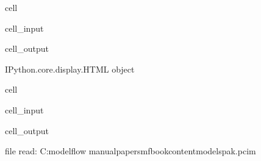 \documentclass[letterpaper,10pt,english]{jupyterBook}
\begin{document}
\begin{sphinxuseclass}{cell}\begin{sphinxVerbatimInput}

\begin{sphinxuseclass}{cell_input}
\begin{sphinxVerbatim}[commandchars=\\\{\}]
    
\end{sphinxVerbatim}

\end{sphinxuseclass}\end{sphinxVerbatimInput}
\begin{sphinxVerbatimOutput}

\begin{sphinxuseclass}{cell_output}
\begin{sphinxVerbatim}[commandchars=\\\{\}]
\PYGZlt{}IPython.core.display.HTML object\PYGZgt{}
\end{sphinxVerbatim}

\end{sphinxuseclass}\end{sphinxVerbatimOutput}

\end{sphinxuseclass}
\begin{sphinxuseclass}{cell}\begin{sphinxVerbatimInput}

\begin{sphinxuseclass}{cell_input}
\begin{sphinxVerbatim}[commandchars=\\\{\}]
  
\end{sphinxVerbatim}

\end{sphinxuseclass}\end{sphinxVerbatimInput}
\begin{sphinxVerbatimOutput}

\begin{sphinxuseclass}{cell_output}
\begin{sphinxVerbatim}[commandchars=\\\{\}]
file read:  C:\PYGZbs{}modelflow manual\PYGZbs{}papers\PYGZbs{}mfbook\PYGZbs{}content\PYGZbs{}models\PYGZbs{}pak.pcim
\end{sphinxVerbatim}

\end{sphinxuseclass}\end{sphinxVerbatimOutput}

\end{sphinxuseclass}
\end{document}
